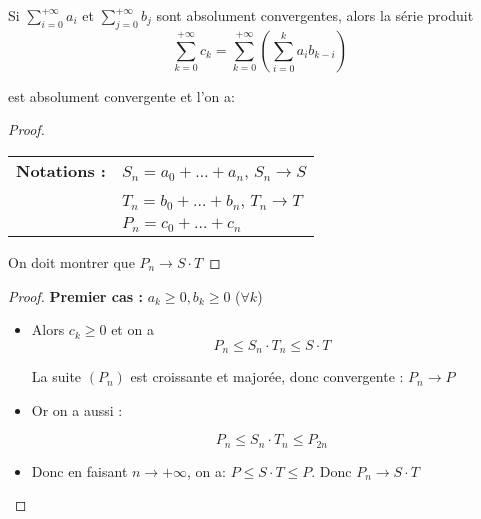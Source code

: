 \begin{frame}
\begin{theoreme}
Si $\displaystyle\sum_{i=0}^{+\infty} a_i$ et $\displaystyle\sum_{j=0}^{+\infty} b_j$ sont absolument convergentes, \pause alors la série produit 
\vspace{-.5cm}
$$\sum_{k=0}^{+\infty} c_k = \sum_{k=0}^{+\infty} \left(\sum_{i=0}^k a_ib_{k-i}\right)$$
\vspace{-.4cm}

est absolument convergente \pause et l'on a:

\vspace{-.3cm}
\end{theoreme}

\pause
\begin{proof}
\begin{tabular}{ll}
\textbf{Notations :}&
\pause $S_n=a_0+\dots+a_n$, $S_n\to S$ \\
\pause& $T_n=b_0+\dots +b_n$, $T_n\to T$\\
\pause& $P_n= c_0+\dots+c_n$
\end{tabular}

\pause
On doit montrer que $P_n \to S\cdot T$
\noqed
\end{proof}
\end{frame}


\begin{frame}
\begin{proof}
\textbf{Premier cas :} $a_k\ge 0, b_k \ge 0$ ($\forall k$)

\begin{itemize}
\item\pause Alors $c_k\ge 0$ et on a 
$$P_n \le S_n \cdot T_n\le S \cdot T$$ 

\pause
La suite $(P_n)$ est croissante et majorée, donc convergente : $P_n\to P$

\item\pause Or on a aussi :

\vspace{-.5cm}
\begin{minipage}{0.39\textwidth}
$$P_n \le S_n \cdot T_n \le P_{2n}$$  
\end{minipage}
\pause
\begin{minipage}{0.49\textwidth}
\end{minipage}

\item\pause Donc en faisant $n\to+\infty$, on a: $P\le S \cdot T\le P$. \pause Donc $P_n\to S \cdot T$\noqed\qedhere
\end{itemize}
\end{proof}
\end{frame}


